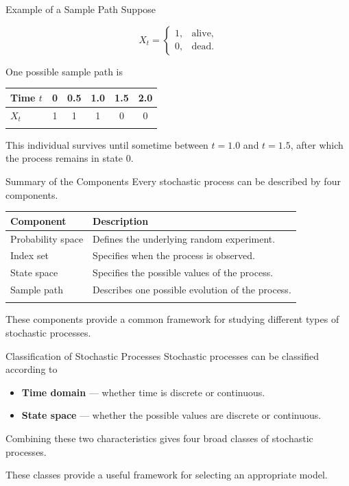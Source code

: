 \documentclass[
  ignorenonframetext,
  aspectratio=169,
]{beamer}
\newcounter{none} %
\providecommand{\tightlist}{%
  \setlength{\itemsep}{0pt}\setlength{\parskip}{0pt}}
\begin{document}
\begin{frame}{Example of a Sample Path}
\protect{}\label{example-of-a-sample-path}
Suppose

\[
X_t=
\begin{cases}
1, & \text{alive},\\
0, & \text{dead}.
\end{cases}
\]

One possible sample path is

{\def\LTcaptype{none} %
\begin{longtable}[]{@{}lccccc@{}}
\toprule\noalign{}
Time \(t\) & 0 & 0.5 & 1.0 & 1.5 & 2.0 \\
\midrule\noalign{}
\endhead
\(X_t\) & 1 & 1 & 1 & 0 & 0 \\
\bottomrule\noalign{}
\end{longtable}
}

This individual survives until sometime between \(t=1.0\) and \(t=1.5\),
after which the process remains in state 0.
\end{frame}

\begin{frame}{Summary of the Components}
\protect{}\label{summary-of-the-components}
Every stochastic process can be described by four components.

{\def\LTcaptype{none} %
\begin{longtable}[]{@{}ll@{}}
\toprule\noalign{}
Component & Description \\
\midrule\noalign{}
\endhead
Probability space & Defines the underlying random experiment. \\
Index set & Specifies when the process is observed. \\
State space & Specifies the possible values of the process. \\
Sample path & Describes one possible evolution of the process. \\
\bottomrule\noalign{}
\end{longtable}
}

These components provide a common framework for studying different types
of stochastic processes.
\end{frame}

\begin{frame}{Classification of Stochastic Processes}
\protect{}\label{classification-of-stochastic-processes}
Stochastic processes can be classified according to

\begin{itemize}
\tightlist
\item
  \textbf{Time domain} --- whether time is discrete or continuous.
\item
  \textbf{State space} --- whether the possible values are discrete or
  continuous.
\end{itemize}

Combining these two characteristics gives four broad classes of
stochastic processes.

These classes provide a useful framework for selecting an appropriate
model.
\end{frame}
\end{document}
